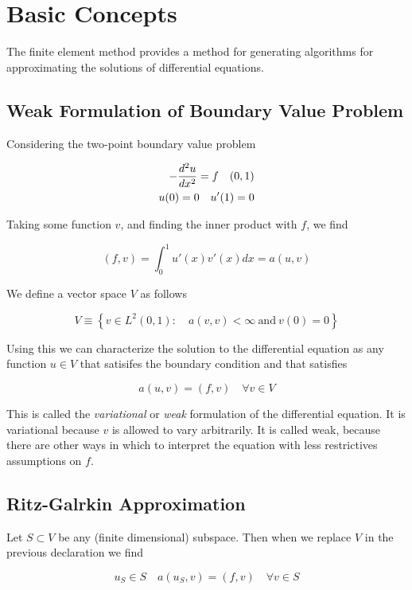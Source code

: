 \documentclass[../FEM.tex]{subfiles}
\begin{document}
\section{Basic Concepts}\label{basic-concepts}

The finite element method provides a method for generating algorithms
for approximating the solutions of differential equations.

\subsection{Weak Formulation of Boundary Value
Problem}\label{weak-formulation-of-boundary-value-problem}

Considering the two-point boundary value problem

\[
\begin{aligned}
-\frac{d^2 u}{d {x}^2}=f\quad(0,1)\\
u(0)=0\quad u'(1)=0
\end{aligned}
\]

Taking some function \(v\), and finding the inner product with \(f\), we
find

\[
(f,v)=\int_{0}^{1}u'(x)v'(x)dx=a(u,v)
\]

We define a vector space \(V\) as follows

\[
V \equiv \left\{ v\in L^2(0,1):\quad a(v,v)< \infty \ \text{and}\ v(0) = 0\right\}
\]

Using this we can characterize the solution to the differential equation
as any function \(u\in V\) that satisifes the boundary condition and
that satisfies

\[
a(u,v)=(f,v)\quad \forall v\in V
\]

This is called the \emph{variational} or \emph{weak} formulation of the
differential equation. It is variational because \(v\) is allowed to
vary arbitrarily. It is called weak, because there are other ways in
which to interpret the equation with less restrictives assumptions on
\(f\).

\subsection{Ritz-Galrkin
Approximation}\label{ritz-galrkin-approximation}

Let \(S \subset V\) be any (finite dimensional) subspace. Then when we
replace \(V\) in the previous declaration we find

\[
u_S \in S\quad a(u_S,v)=(f,v)\quad \forall v\in S
\]
\end{document}
